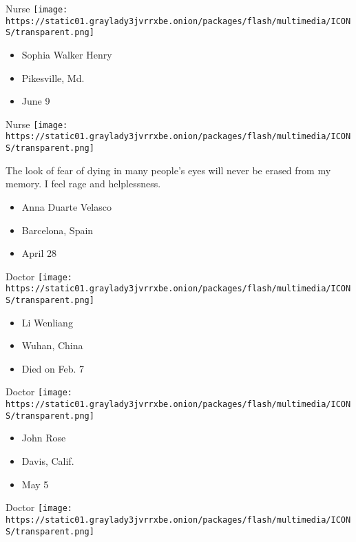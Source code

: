 \protect\hyperlink{item-sophia-walker-henry}{}

Nurse
\texttt{[image: https://static01.graylady3jvrrxbe.onion/packages/flash/multimedia/ICONS/transparent.png]}

\begin{itemize}
\tightlist
\item
  Sophia Walker Henry
\item
  Pikesville, Md.
\item
  June 9
\end{itemize}

\protect\hyperlink{item-anna-duarte-velasco}{}

Nurse
\texttt{[image: https://static01.graylady3jvrrxbe.onion/packages/flash/multimedia/ICONS/transparent.png]}

The look of fear of dying in many people's eyes will never be erased
from my memory. I feel rage and helplessness.

\begin{itemize}
\tightlist
\item
  Anna Duarte Velasco
\item
  Barcelona, Spain
\item
  April 28
\end{itemize}

\protect\hyperlink{item-li-wenliang}{}

Doctor
\texttt{[image: https://static01.graylady3jvrrxbe.onion/packages/flash/multimedia/ICONS/transparent.png]}

\begin{itemize}
\tightlist
\item
  Li Wenliang
\item
  Wuhan, China
\item
  Died on Feb. 7
\end{itemize}

\protect\hyperlink{item-john-rose}{}

Doctor
\texttt{[image: https://static01.graylady3jvrrxbe.onion/packages/flash/multimedia/ICONS/transparent.png]}

\begin{itemize}
\tightlist
\item
  John Rose
\item
  Davis, Calif.
\item
  May 5
\end{itemize}

\protect\hyperlink{item-jaques-sztajnbok}{}

Doctor
\texttt{[image: https://static01.graylady3jvrrxbe.onion/packages/flash/multimedia/ICONS/transparent.png]}

